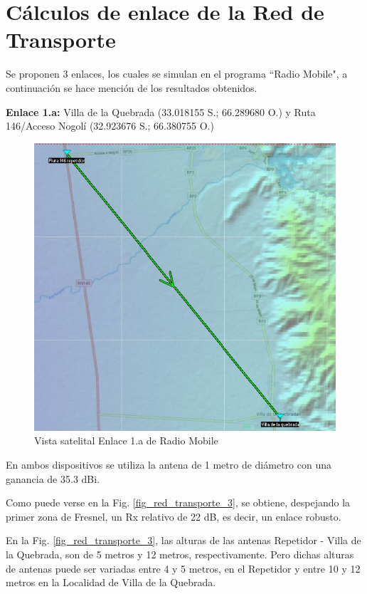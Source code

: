 \documentclass[12pt,a4paper]{book}
\begin{document}





\appendix
\clearpage
\addappheadtotoc
\appendixpage

\chapter{Cálculos de enlace de la Red de Transporte} \label{ane_calculo_red_trasporte}
Se proponen 3 enlaces, los cuales se simulan en el programa ``Radio Mobile", a continuación se hace mención de los resultados obtenidos.

\bigskip 

\noindent\textbf{Enlace 1.a:} Villa de la Quebrada (33.018155 S.; 66.289680 O.) y Ruta 146/Acceso Nogolí (32.923676 S.; 66.380755 O.)

\begin{figure} [H]
\centering
\includegraphics[width= 10 cm]{../figuras/red_transporte_2.jpg}
\caption{Vista satelital Enlace 1.a de Radio Mobile}
\label{fig_red_transporte_2}
\end{figure}

En ambos dispositivos se utiliza la antena de 1 metro de diámetro con una ganancia de 35.3 dBi.

Como puede verse en la Fig. \ref{fig_red_transporte_3}, se obtiene, despejando la primer zona de Fresnel, un Rx relativo de 22 dB, es decir, un enlace robusto.

En la Fig. \ref{fig_red_transporte_3}, las alturas de las antenas Repetidor - Villa de la Quebrada, son de 5 metros y 12 metros, respectivamente. Pero dichas alturas de antenas puede ser variadas entre 4 y 5 metros, en el Repetidor y entre 10 y 12 metros en la Localidad de Villa de la Quebrada.
\end{document}
